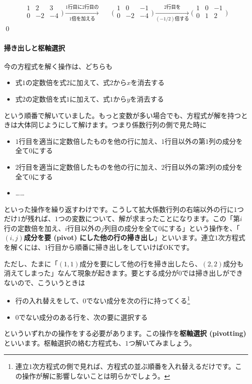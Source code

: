 \begin{align*}
\begin{array}{rr|r}
1 & 2 & 3 \\
0 & -2 & -4 \\
\end{array}
\biggr)  \xrightarrow[\text{$1$倍を加える}]{\text{$1$行目に$2$行目の}}
& & \biggl(
\begin{array}{rr|r}
1 & 0 & -1 \\
0 & -2 & -4 \\
\end{array}
\biggr) \xrightarrow[\text{$(-1/2)$倍する}]{\text{$2$行目を}}
\biggl(
\begin{array}{rr|r}
1 & 0 & -1 \\
0 & 1 & 2 \\
\end{array}
\biggr)
\end{align*}
\qed

\paragraph{掃き出しと枢軸選択} 今の方程式を解く操作は、どちらも
\begin{itemize}
\item 式$1$の定数倍を式$2$に加えて、式$2$から$x$を消去する
\item 式$2$の定数倍を式$1$に加えて、式$1$から$y$を消去する
\end{itemize}
という順番で解いていました。もっと変数が多い場合でも、方程式が解を持つときは大体同じようにして解けます。つまり係数行列の側で見た時に
\begin{itemize}
\item $1$行目を適当に定数倍したものを他の行に加え、$1$行目以外の第$1$列の成分を全て$0$にする
\item $2$行目を適当に定数倍したものを他の行に加え、$2$行目以外の第$2$列の成分を全て$0$にする
\item ……
\end{itemize}
といった操作を繰り返すわけです。こうして拡大係数行列の右端以外の行に$1$つだけ$1$が残れば、$1$つの変数について、解が求まったことになります。この「第$i$行の定数倍を加え、$i$行目以外の$j$列目の成分を全て$0$にする」という操作を、「\textbf{$(i, j)$成分を要 (pivot) にした他の行の掃き出し}」といいます。連立$1$次方程式を解くには、$1$行目から順番に掃き出しをしていけばOKです。

ただし、たまに「$(1, 1)$成分を要にして他の行を掃き出したら、$(2, 2)$成分も消えてしまった」なんて現象が起きます。要とする成分が$0$では掃き出しができないので、こういうときは
\begin{itemize}
\item 行の入れ替えをして、$0$でない成分を次の行に持ってくる\footnote{連立$1$次方程式の側で見れば、方程式の並ぶ順番を入れ替えるだけです。この操作が解に影響しないことは明らかでしょう。}
\item $0$でない成分のある行を、次の要に選択する
\end{itemize}
といういずれかの操作をする必要があります。この操作を\textbf{枢軸選択 (pivotting)}といいます。枢軸選択の絡む方程式も、$1$つ解いてみましょう。

